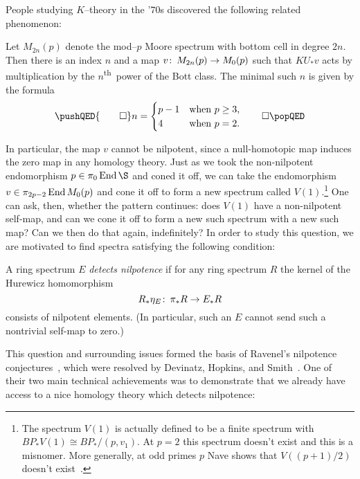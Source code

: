 \noindent People studying \(K\)--theory in the '\(70\)s discovered the following related phenomenon:

\begin{theorem}\label{AdamsSelfMapThm}
Let \(M_{2n}(p)\) denote the mod--\(p\) Moore spectrum with bottom cell in degree \(2n\).  Then there is an index \(n\) and a map \(v\colon\thinspace M_{2n}(p) \to M_0(p)\) such that \(KU_* v\) acts by multiplication by the \(n\)\textsuperscript{th}\, power of the Bott class.  The minimal such \(n\) is given by the formula
\[
\pushQED{\qed}
n = \begin{cases} p-1 & \text{when \(p \ge 3\)}, \\ 4 & \text{when \(p = 2\)}. \end{cases}
\qedhere
\popQED
\]
\end{theorem}

\noindent In particular, the map \(v\) cannot be nilpotent, since a null-homotopic map induces the zero map in any homology theory.  Just as we took the non-nilpotent endomorphism \(p \in \pi_0 \End \S\) and coned it off, we can take the endomorphism \(v \in \pi_{2p-2} \operatorname{End} M_0(p)\) and cone it off to form a new spectrum called \(V(1)\).\footnote{The spectrum \(V(1)\) is actually defined to be a finite spectrum with \(BP_* V(1) \cong BP_* / (p, v_1)\). At \(p = 2\) this spectrum doesn't exist and this is a misnomer.  More generally, at odd primes \(p\) Nave shows that \(V((p+1)/2)\) doesn't exist~\cite[Theorem 1.3]{Nave}.}  One can ask, then, whether the pattern continues: does \(V(1)\) have a non-nilpotent self-map, and can we cone it off to form a new such spectrum with a new such map?  Can we then do that again, indefinitely?  In order to study this question, we are motivated to find spectra satisfying the following condition:

\begin{definition}
A ring spectrum \(E\) \textit{detects nilpotence} if for any ring spectrum \(R\) the kernel of the Hurewicz homomorphism \[R_*\eta_E\colon\thinspace \pi_* R \to E_* R\] consists of nilpotent elements.  (In particular, such an \(E\) cannot send such a nontrivial self-map to zero.)
\end{definition}

This question and surrounding issues formed the basis of Ravenel's nilpotence conjectures~\cite[Section 10]{RavenelLocalizationWRTPeriodic}, which were resolved by Devinatz, Hopkins, and Smith~\cite{DHS,HopkinsSmith}.  One of their two main technical achievements was to demonstrate that we already have access to a nice homology theory which detects nilpotence:

